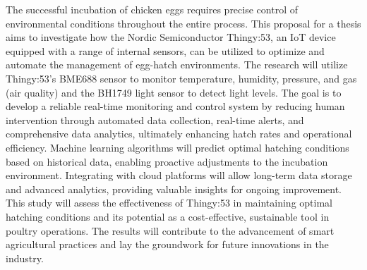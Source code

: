 
\begin{abstracts}        %

The successful incubation of chicken eggs requires precise control of environmental conditions throughout the entire process. This proposal for a thesis aims to investigate how the Nordic Semiconductor Thingy:53, an IoT device equipped with a range of internal sensors, can be utilized to optimize and automate the management of egg-hatch environments. The research will utilize Thingy:53’s BME688 sensor to monitor temperature, humidity, pressure, and gas (air quality) and the BH1749 light sensor to detect light levels. The goal is to develop a reliable real-time monitoring and control system by reducing human intervention through automated data collection, real-time alerts, and comprehensive data analytics, ultimately enhancing hatch rates and operational efficiency. Machine learning algorithms will predict optimal hatching conditions based on historical data, enabling proactive adjustments to the incubation environment. Integrating with cloud platforms will allow long-term data storage and advanced analytics, providing valuable insights for ongoing improvement. This study will assess the effectiveness of Thingy:53 in maintaining optimal hatching conditions and its potential as a cost-effective, sustainable tool in poultry operations. The results will contribute to the advancement of smart agricultural practices and lay the groundwork for future innovations in the industry.

\end{abstracts}
